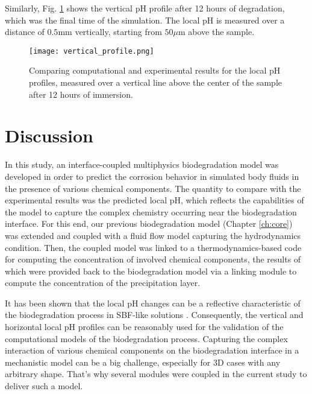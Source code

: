 Similarly, Fig. \ref{fig:kinetics_vertical_profile} shows the vertical pH profile after 12 hours of degradation, which was the final time of the simulation. The local pH is measured over a distance of $0.5 \mathrm{mm}$ vertically, starting from $50 \mu\mathrm{m}$ above the sample.

\begin{figure}[h]
\centering
\medskip
\texttt{[image: vertical\_profile.png]}
\caption[Comparing computational and experimental vertical pH profiles]{Comparing computational and experimental results for the local pH profiles, measured over a vertical line above the center of the sample after 12 hours of immersion.} \label{fig:kinetics_vertical_profile}
\end{figure}

\section{Discussion}

In this study, an interface-coupled multiphysics biodegradation model was developed in order to predict the corrosion behavior in simulated body fluids in the presence of various chemical components. The quantity to compare with the experimental results was the predicted local pH, which reflects the capabilities of the model to capture the complex chemistry occurring near the biodegradation interface. For this end, our previous biodegradation model \cite{Barzegari2021} (Chapter \ref{ch:core}) was extended and coupled with a fluid flow model capturing the hydrodynamics condition. Then, the coupled model was linked to a thermodynamics-based code for computing the concentration of involved chemical components, the results of which were provided back to the biodegradation model via a linking module to compute the concentration of the precipitation layer.

It has been shown that the local pH changes can be a reflective characteristic of the biodegradation process in {SBF}-like solutions \cite{Gonzalez2021,Wang2022}. Consequently, the vertical and horizontal local pH profiles can be reasonably used for the validation of the computational models of the biodegradation process. Capturing the complex interaction of various chemical components on the biodegradation interface in a mechanistic model can be a big challenge, especially for 3D cases with any arbitrary shape. That's why several modules were coupled in the current study to deliver such a model.

